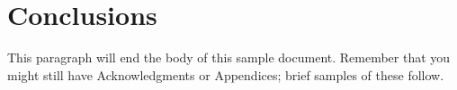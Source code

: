 \documentclass{sig-alternate-05-2015}
\begin{document}
\section{Conclusions}
This paragraph will end the body of this sample document.
Remember that you might still have Acknowledgments or
Appendices; brief samples of these
follow.








%
\end{document}

